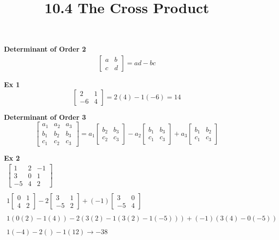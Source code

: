 \documentclass{article}
\title{10.4 The Cross Product}
\begin{document}
  \maketitle
  \textbf{Determinant of Order 2}
  \[
    \begin{gathered}
    \begin{bmatrix}
      a & b\\
      c & d
    \end{bmatrix} = ad - bc
    \end{gathered}
  \]

  \textbf{Ex 1}
  \[
    \begin{bmatrix}
      2 &1\\
      -6 &4
    \end{bmatrix} = 2(4) -1(-6) = \boxed{14}
  \]

  \textbf{Determinant of Order 3}
  \[
    \begin{bmatrix}
      a_1 &a_2  &a_3\\
      b_1 &b_2 &b_3\\
      c_1 &c_2 &c_3
    \end{bmatrix} = 
    a_1 \begin{bmatrix}
      b_2 &b_3\\
      c_2 &c_3
    \end{bmatrix}
    - a_2 \begin{bmatrix}
      b_1 &b_3\\
      c_1 &c_3
    \end{bmatrix} +
    a_3 \begin{bmatrix}
     b_1 &b_2\\
     c_1 &c_3
    \end{bmatrix}
  \] 

  \textbf{Ex 2}
  \[
    \begin{gathered}
    \begin{bmatrix}
      1 &2 &-1\\
      3 &0 &1\\
      -5 &4 &2
    \end{bmatrix}\\
    ~\\
    1 \begin{bmatrix}
      0 &1\\
      4 &2
    \end{bmatrix} -
    2 \begin{bmatrix}
      3 &1\\
      -5 &2
    \end{bmatrix} +
    (-1) \begin{bmatrix}
      3 &0\\
      -5 &4
    \end{bmatrix}\\
    ~\\
    1(0(2)- 1(4))-2(3(2)-1(3(2)-1(-5)))+(-1)(3(4)-0(-5))\\
    ~\\
    1(-4)-2()-1(12)\to \boxed{-38}
    \end{gathered}
  \]
\end{document}
